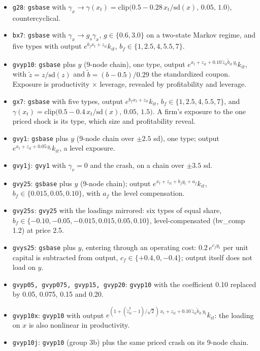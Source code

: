 \begin{itemize}
\item \texttt{g28}: \texttt{gsbase} with $\gamma_x\to\gamma(x_t)=\mathrm{clip}\big(0.5-0.28\,x_t/\mathrm{sd}(x),\,0.05,\,1.0\big)$, countercyclical.
\item \texttt{bx7}: \texttt{gsbase} with $\gamma_x\to g_s\gamma_x$, $g\in\{0.6,3.0\}$ on a two-state Markov regime, and five types with output $e^{b_f x_t+z_{it}}k_{it}$, $b_f\in\{1,2.5,4,5.5,7\}$.
\item \texttt{gvyp10}: \texttt{gsbase} plus $y$ (9-node chain), one type, output $e^{x_t+z_{it}+0.10\,\tilde z_{it}\tilde b_{it}\,y_t}k_{it}$, with $\tilde z=z/\mathrm{sd}(z)$ and $\tilde b=(b-0.5)/0.29$ the standardized coupon. Exposure is productivity $\times$ leverage, revealed by profitability and leverage.
\item \texttt{gx7}: \texttt{gsbase} with five types, output $e^{b_f x_t+z_{it}}k_{it}$, $b_f\in\{1,2.5,4,5.5,7\}$, and $\gamma(x_t)=\mathrm{clip}\big(0.5-0.4\,x_t/\mathrm{sd}(x),\,0.05,\,1.5\big)$. A firm's exposure to the one priced shock is its type, which size and profitability reveal.
\item \texttt{gvy1}: \texttt{gsbase} plus $y$ (9-node chain over $\pm2.5$ sd), one type; output $e^{x_t+z_{it}+0.05\,y_t}k_{it}$, a level exposure.
\item \texttt{gvy1j}: \texttt{gvy1} with $\gamma_v=0$ and the crash, on a chain over $\pm3.5$ sd.
\item \texttt{gvy25}: \texttt{gsbase} plus $y$ (9-node chain); output $e^{x_t+z_{it}+b_f y_t+a_f}k_{it}$, $b_f\in\{0.015,0.05,0.10\}$, with $a_f$ the level compensation.
\item \texttt{gvy25s}: \texttt{gvy25} with the loadings mirrored: six types of equal share, $b_f\in\{-0.10,-0.05,-0.015,0.015,0.05,0.10\}$, level-compensated (bv\_comp 1.2) at price 2.5.
\item \texttt{gvys25}: \texttt{gsbase} plus $y$, entering through an operating cost: $0.2\,e^{c_f y_t}$ per unit capital is subtracted from output, $c_f\in\{+0.4,0,-0.4\}$; output itself does not load on $y$.
\item \texttt{gvyp05, gvyp075, gvyp15, gvyp20}: \texttt{gvyp10} with the coefficient 0.10 replaced by 0.05, 0.075, 0.15 and 0.20.
\item \texttt{gvyp10x}: \texttt{gvyp10} with output $e^{(1+(\tilde z_{it}^2-1)/\sqrt2)\,x_t+z_{it}+0.10\,\tilde z_{it}\tilde b_{it}\,y_t}k_{it}$: the loading on $x$ is also nonlinear in productivity.
\item \texttt{gvyp10j}: \texttt{gvyp10} (group 3b) plus the same priced crash on its 9-node chain.

\end{itemize}
